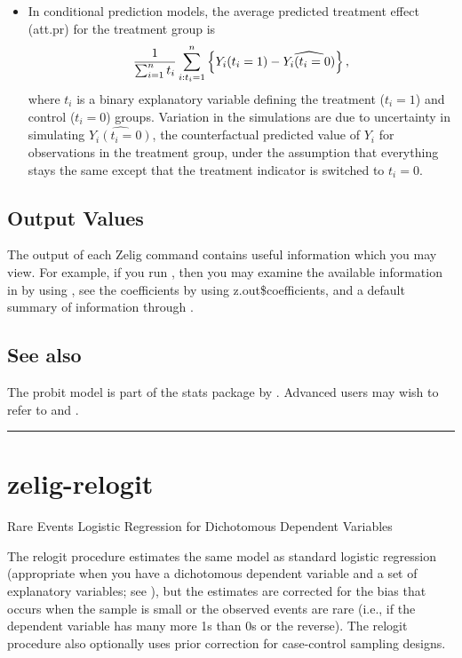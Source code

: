 \documentclass[letterpaper,10pt,english]{sphinxmanual}
\begin{document}
\begin{itemize}
\item {} 
In conditional prediction models, the average predicted treatment
effect (att.pr) for the treatment group is
\begin{gather}
\begin{split}\frac{1}{\sum_{i=1}^n t_i}\sum_{i:t_i=1}^n \left\{ Y_i(t_i=1) -
      \widehat{Y_i(t_i=0)} \right\},\end{split}\notag
\end{gather}
where \(t_i\) is a binary explanatory variable defining the
treatment (\(t_i=1\)) and control (\(t_i=0\)) groups.
Variation in the simulations are due to uncertainty in simulating
\(\widehat{Y_i(t_i=0)}\), the counterfactual predicted value of
\(Y_i\) for observations in the treatment group, under the
assumption that everything stays the same except that the treatment
indicator is switched to \(t_i=0\).

\end{itemize}


\subsection{Output Values}
\label{vignette:id50}
The output of each Zelig command contains useful information which you
may view. For example, if you run
, then you may examine
the available information in  by using , see
the coefficients by using z.out\$coefficients, and a default summary of
information through .


\subsection{See also}
\label{vignette:id51}
The probit model is part of the stats package by . Advanced users may
wish to refer to  and .


\bigskip\hrule{}\bigskip



\section{zelig-relogit}
\label{vignette:zrelogit}\label{vignette:zelig-relogit}
Rare Events Logistic Regression for Dichotomous Dependent Variables

The relogit procedure estimates the same model as standard logistic
regression (appropriate when you have a dichotomous dependent variable
and a set of explanatory variables; see ), but the estimates are
corrected for the bias that occurs when the sample is small or the
observed events are rare (i.e., if the dependent variable has many more
1s than 0s or the reverse). The relogit procedure also optionally uses
prior correction for case-control sampling designs.
\end{document}
